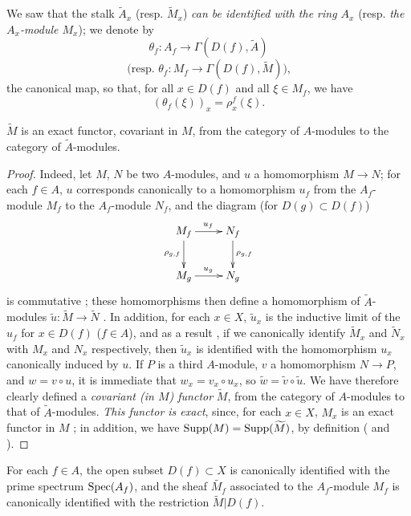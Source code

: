 We saw  that the stalk $\widetilde{A}_x$ (resp. $\widetilde{M}_x$) \emph{can be identified with the ring $A_x$} (resp. \emph{the $A_x$-module $M_x$});
we denote by
\[
  \theta_f:A_f\to\Gamma(D(f),\widetilde{A})
\]
\[
  \text{(resp. }\theta_f:M_f\to\Gamma(D(f),\widetilde{M})\text{),}
\]
the canonical map, so that, for all $x\in D(f)$ and all $\xi\in M_f$, we have
\[
  (\theta_f(\xi))_x=\rho_x^f(\xi).
  \tag{1.3.4.1}
\]

\begin{proposition}[1.3.5]
\label{I.1.3.5}
$\widetilde{M}$ is an exact functor, covariant in $M$, from the category of $A$-modules to the category of $\widetilde{A}$-modules.
\end{proposition}

\begin{proof}
Indeed, let $M$, $N$ be two $A$-modules, and $u$ a homomorphism $M\to N$;
for each $f\in A$, $u$ corresponds canonically to a homomorphism $u_f$ from the $A_f$-module $M_f$ to the $A_f$-module $N_f$, and the diagram (for $D(g)\subset D(f)$)
\[
  \xymatrix{
    M_f\ar[r]^{u_f}\ar[d]_{\rho_{g,f}} & N_f\ar[d]^{\rho_{g,f}}\\
    M_g\ar[r]^{u_g} & N_g
  }
\]
is commutative ;
these homomorphisms then define a homomorphism of $\widetilde{A}$-modules $\widetilde{u}:\widetilde{M}\to\widetilde{N}$ .
In addition, for each $x\in X$, $\widetilde{u}_x$ is the inductive limit of the $u_f$ for $x\in D(f)$ ($f\in A$), and as a result , if we canonically identify $\widetilde{M}_x$ and $\widetilde{N}_x$ with $M_x$ and $N_x$ respectively, then $\widetilde{u}_x$ is identified with the homomorphism $u_x$ canonically induced by $u$.
If $P$ is a third $A$-module, $v$ a homomorphism $N\to P$, and $w=v\circ u$, it is immediate that $w_x=v_x\circ u_x$, so $\widetilde{w}=\widetilde{v}\circ\widetilde{u}$.
We have therefore clearly defined a \emph{covariant (in $M$) functor} $\widetilde{M}$, from the category of $A$-modules to that of $\widetilde{A}$-modules.
\emph{This functor is exact}, since, for each $x\in X$, $M_x$ is an exact functor in $M$ ;
in addition, we have $\operatorname{Supp}(M)=\operatorname{Supp}(\widetilde{M})$, by definition ( and ).
\end{proof}

\begin{proposition}[1.3.6]
\label{I.1.3.6}
For each $f\in A$, the open subset $D(f)\subset X$ is canonically identified with the prime spectrum $\operatorname{Spec}(A_f)$, and the sheaf $\widetilde{M_f}$ associated to the $A_f$-module $M_f$ is canonically identified with the restriction $\widetilde{M}|D(f)$.
\end{proposition}

